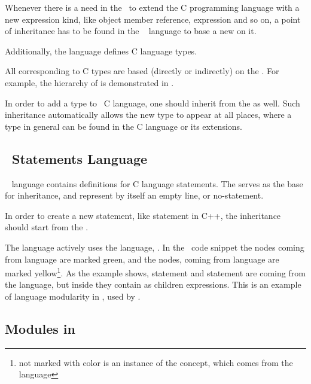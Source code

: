 Whenever there is a need in the \cpppl\ to extend the C programming language with a new expression kind, like 
object member reference,  expression and so on, a point of inheritance has to be found in the 
\mbdr\  language to base a new  on it.

Additionally, the  language defines  C language types. 


All  corresponding to C types are based (directly or indirectly) on the  .
For example, the hierarchy of   is demonstrated in . 

In order to add a type to \mbdr\ C language, one should inherit from the   as well.
Such inheritance automatically allows the new type to appear at all places, where a type in general can be found
in the C language or its extensions.


\subsection{\mbdr\ Statements Language}

\mbdr\  language contains definitions for C language statements. The   serves as the
base for inheritance, and represent by itself an empty line, or no-statement.

In order to create a new statement, like  statement in C++, the inheritance should start from the  .


The  language actively uses the  language, . In the \mbdr\ code snippet
the nodes coming from  language are marked green, and the nodes, coming from  language are
marked yellow\footnote{not marked with color is an instance of the  concept, which comes from the  language}. As the example shows,  statement and  statement are coming from the  language,
but inside they contain as children expressions. This is an example of language modularity in \jbmps, used by \mbdr.

\subsection{Modules in \mbdr}

